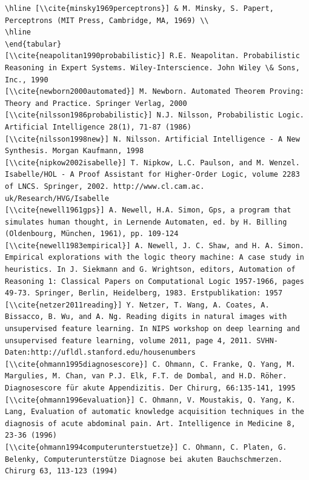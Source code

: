 \documentclass[10pt]{book}
\begin{document}
\begin{verbatim}
\hline [\\cite{minsky1969perceptrons}] & M. Minsky, S. Papert, Perceptrons (MIT Press, Cambridge, MA, 1969) \\
\hline
\end{tabular}
[\\cite{neapolitan1990probabilistic}] R.E. Neapolitan. Probabilistic Reasoning in Expert Systems. Wiley-Interscience. John Wiley \& Sons, Inc., 1990
[\\cite{newborn2000automated}] M. Newborn. Automated Theorem Proving: Theory and Practice. Springer Verlag, 2000
[\\cite{nilsson1986probabilistic}] N.J. Nilsson, Probabilistic Logic. Artificial Intelligence 28(1), 71-87 (1986)
[\\cite{nilsson1998new}] N. Nilsson. Artificial Intelligence - A New Synthesis. Morgan Kaufmann, 1998
[\\cite{nipkow2002isabelle}] T. Nipkow, L.C. Paulson, and M. Wenzel. Isabelle/HOL - A Proof Assistant for Higher-Order Logic, volume 2283 of LNCS. Springer, 2002. http://www.cl.cam.ac. uk/Research/HVG/Isabelle
[\\cite{newell1961gps}] A. Newell, H.A. Simon, Gps, a program that simulates human thought, in Lernende Automaten, ed. by H. Billing (Oldenbourg, München, 1961), pp. 109-124
[\\cite{newell1983empirical}] A. Newell, J. C. Shaw, and H. A. Simon. Empirical explorations with the logic theory machine: A case study in heuristics. In J. Siekmann and G. Wrightson, editors, Automation of Reasoning 1: Classical Papers on Computational Logic 1957-1966, pages 49-73. Springer, Berlin, Heidelberg, 1983. Erstpublikation: 1957
[\\cite{netzer2011reading}] Y. Netzer, T. Wang, A. Coates, A. Bissacco, B. Wu, and A. Ng. Reading digits in natural images with unsupervised feature learning. In NIPS workshop on deep learning and unsupervised feature learning, volume 2011, page 4, 2011. SVHN-Daten:http://ufldl.stanford.edu/housenumbers
[\\cite{ohmann1995diagnosescore}] C. Ohmann, C. Franke, Q. Yang, M. Margulies, M. Chan, van P.J. Elk, F.T. de Dombal, and H.D. Röher. Diagnosescore für akute Appendizitis. Der Chirurg, 66:135-141, 1995
[\\cite{ohmann1996evaluation}] C. Ohmann, V. Moustakis, Q. Yang, K. Lang, Evaluation of automatic knowledge acquisition techniques in the diagnosis of acute abdominal pain. Art. Intelligence in Medicine 8, 23-36 (1996)
[\\cite{ohmann1994computerunterstuetze}] C. Ohmann, C. Platen, G. Belenky, Computerunterstütze Diagnose bei akuten Bauchschmerzen. Chirurg 63, 113-123 (1994)

\end{verbatim}
\end{document}
